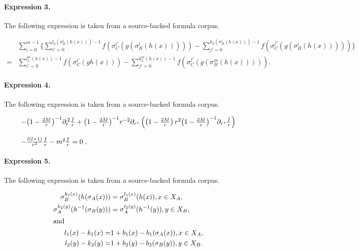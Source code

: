 \documentclass[11pt]{article}
\begin{document}
\paragraph{Expression 3.} The following expression is taken from a source-backed formula corpus.

\begin{align*}& \sum_{i=0}^{m-1} \{\sum_{i'=0}^{l_2 (\sigma_B^i(h(x)))-1} f(\sigma_C^{i'}(g(\sigma_B^i(h(x)))))-\sum_{j'=0}^{k_2 (\sigma_B^i(h(x)))-1} f(\sigma_C^{j'}(g(\sigma_B^{i}(h(x))))) \}\\=&\sum_{i'=0}^{l_2^m (h(x))-1} f(\sigma_C^{i'}(gh(x)))-\sum_{j'=0}^{k_2^m (h(x))-1} f(\sigma_C^{j'}(g(\sigma_B^{m}(h(x))))).\end{align*}

\paragraph{Expression 4.} The following expression is taken from a source-backed formula corpus.

\begin{align*}\begin{array}{l}-{\left(1-{2M\over r}\right)}^{-1}\partial_t^{\,2}{f\over r}+{\left(1-{2M\over r}\right)}^{-1}r^{-2}\partial_{r^*}\left(\left(1-{2M\over r}\right)r^2{\left(1-{2M\over r}\right)}^{-1}\partial_{r^*}{f\over r}\right)\\\\-\frac{l\left(l+1\right)}{r^2}{f\over r}-m^2{f\over r}=0\;,\end{array}\end{align*}

\paragraph{Expression 5.} The following expression is taken from a source-backed formula corpus.

\begin{align*}\sigma_B^{k_1(x)} (h(\sigma_A(x))) & = \sigma_B^{l_1(x)}(h(x)),x \in X_A, \\\sigma_A^{k_2(y)} (h^{-1}(\sigma_B(y))) & = \sigma_A^{l_2(y)}(h^{-1}(y)),y \in X_B, \\\intertext{and}l_1(x) - k_1(x) = & 1 + b_1(x) - b_1(\sigma_A(x)), x \in X_A, \\l_2(y) - k_2(y) = & 1 + b_2(y) - b_2(\sigma_B(y)), y \in X_B. \end{align*}
\end{document}
